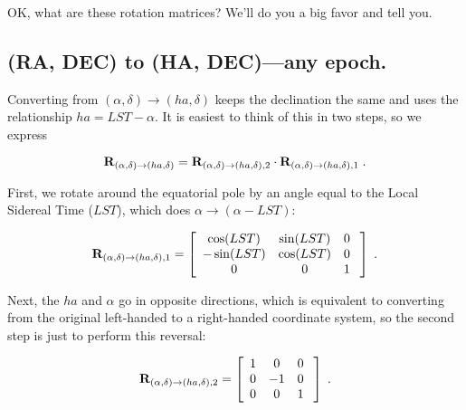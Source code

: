 	OK, what are these rotation matrices? We'll do you a big favor
and tell you.  

\subsection {(RA, DEC) to (HA, DEC)---any epoch.}

	Converting from $(\alpha, \delta) \rightarrow (ha, \delta)$
keeps the declination the same and uses the relationship $ha = LST -
\alpha$.  It is easiest to think of this in two steps, so we express

\begin{equation} 
{\bf R}_{(\alpha, \delta) \rightarrow (ha, \delta)} = 
{\bf R}_{(\alpha, \delta) \rightarrow (ha, \delta), 2} \cdot 
{\bf R}_{(\alpha, \delta) \rightarrow (ha, \delta), 1} \; .
\end{equation} 

\noindent First, we rotate around the equatorial pole by an angle equal
to the Local Sidereal Time ($LST$), which does $\alpha \rightarrow
(\alpha - LST)$:

\begin{mathletters} 
\begin{eqnarray} 
{\bf R}_{(\alpha, \delta) \rightarrow (ha, \delta),1} = \left[ 
\begin{array}{ccc} 
    \cos(LST) & \sin(LST) &  0 \\
   -\sin(LST) & \cos(LST) &  0 \\
            0 &  0        &  1 \\
\end{array} 
\; \right] \; .
\end{eqnarray} 

\noindent Next, the $ha$ and $\alpha$ go in opposite directions, which
is equivalent to converting from the original left-handed to a
right-handed coordinate system, so the second step is just to perform
this reversal:

\begin{eqnarray} 
{\bf R}_{(\alpha, \delta) \rightarrow (ha, \delta), 2}  = \left[
\begin{array}{ccc}
    1 & 0 &  0 \\
    0 & -1&  0 \\
    0 &  0&  1 \\
\end{array} 
\; \right] \; .
\end{eqnarray} 
\end{mathletters} 

